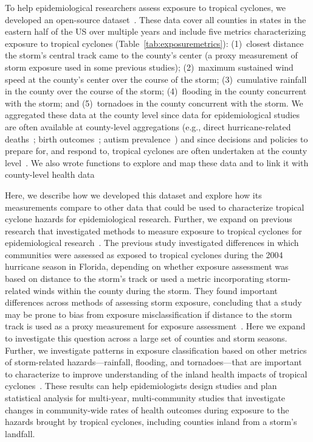 To help epidemiological researchers assess exposure to tropical cyclones, we
developed an open-source dataset~\parencite{hurricaneexposure}.  These data
cover all counties in states in the eastern half of the \ac{US} over multiple
years and include five metrics characterizing exposure to tropical cyclones
(Table~\ref{tab:exposuremetrics}): (1)~closest distance the storm's central
track came to the county's center (a proxy measurement of storm exposure used
in some previous studies); (2)~maximum sustained wind speed at the county's
center over the course of the storm; (3)~cumulative rainfall in the county over
the course of the storm; (4)~flooding in the county
concurrent with the storm; and (5)~tornadoes in the county
concurrent with the storm.  We aggregated these data at the county level since
data for epidemiological studies are often available at county-level
aggregations (e.g., direct hurricane-related deaths~\parencite{czajkowski2011};
birth outcomes~\parencite{grabich2015, grabich2015measuring}; autism
prevalence~\parencite{kinney2008}) and since decisions and policies to prepare
for, and respond to, tropical cyclones are often undertaken at the county
level~\parencite{zandbergen2009, rappaport2000}.  We also wrote functions to
explore and map these data and to link it with county-level health
data~\parencite{hurricaneexposuredata} 

Here, we describe how we developed this dataset and explore how its
measurements compare to other data that could be used to characterize tropical
cyclone hazards for epidemiological research. Further, we expand
on previous research that investigated methods to measure exposure to tropical
cyclones for epidemiological research~\parencite{grabich2015measuring}.  The
previous study investigated differences in which communities were assessed as
exposed to tropical cyclones during the 2004 hurricane season in Florida,
depending on whether exposure assessment was based on distance to the storm's
track or used a metric incorporating storm-related winds within the county
during the storm.  They found important differences across methods of assessing
storm exposure, concluding that a study may be prone to bias from exposure
misclassification if distance to the storm track is used as a proxy measurement
for exposure assessment~\parencite{grabich2015measuring}.  Here we expand to
investigate this question across a large set of counties and storm seasons.
Further, we investigate patterns in exposure classification based on other
metrics of storm-related hazards---rainfall, flooding, and tornadoes---that are
important to characterize to improve understanding of the inland health impacts
of tropical cyclones~\parencite{czajkowski2011, moore2012}. These results can
help epidemiologists design studies and plan statistical analysis for
multi-year, multi-community studies that investigate changes in community-wide
rates of health outcomes during exposure to the hazards brought by tropical
cyclones, including counties inland from a storm's landfall. 
